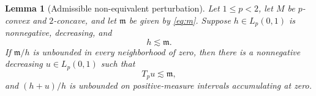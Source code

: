 \documentclass[11pt]{article}
\newtheorem{lemma}[theorem]{Lemma}
\theoremstyle{definition}
\theoremstyle{remark}
\newcommand{\Tp}{T_p}
\newcommand{\mfun}{\mathfrak m}
\newcommand{\lesssimc}{\mathrel{\lesssim}}
\begin{document}
\begin{lemma}[Admissible non-equivalent perturbation]\label{lem:staircase}
Let $1\leq p<2$, let $M$ be $p$-convex and $2$-concave, and let $\mfun$ be
given by \eqref{eq:m}.  Suppose $h\in L_p(0,1)$ is nonnegative, decreasing,
and
\begin{equation}\label{eq:h-upper}
  h\lesssimc\mfun.
\end{equation}
If $\mfun/h$ is unbounded in every neighborhood of zero, then there is a
nonnegative decreasing $u\in L_p(0,1)$ such that
\begin{equation}\label{eq:u-bound}
  \Tp u\lesssimc\mfun,
\end{equation}
and $(h+u)/h$ is unbounded on positive-measure intervals accumulating at zero.
\end{lemma}
\end{document}
